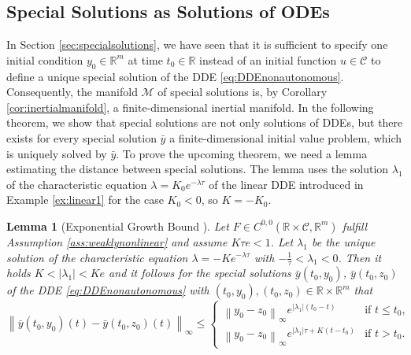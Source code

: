 \documentclass[10pt]{article}
\numberwithin{equation}{section}
\newtheorem{lemma}[theorem]{Lemma}
\newcommand\norm[1]{\left\lVert#1\right\rVert}
\begin{document}
	
	
	
	\subsection{Special Solutions as Solutions of ODEs}
	\label{sec:specialODE}
	
	In Section \ref{sec:specialsolutions}, we have seen that it is sufficient to specify one initial condition $y_0\in \mathbb{R}^m$ at time $t_0\in \mathbb{R}$ instead of an initial function $u \in \mathcal{C}$ to define a unique special solution of the DDE \eqref{eq:DDEnonautonomous}. Consequently, the manifold $\mathcal{M}$ of special solutions is, by Corollary \ref{cor:inertialmanifold}, a finite-dimensional inertial manifold. In the following theorem, we show that special solutions are not only solutions of DDEs, but there exists for every special solution $\bar{y}$ a finite-dimensional initial value problem, which is uniquely solved by $\bar{y}$. To prove the upcoming theorem, we need a lemma estimating the distance between special solutions. The lemma uses the solution $\lambda_1$ of the characteristic equation $\lambda = K_0 e^{-\lambda \tau}$ of the linear DDE introduced in Example \ref{ex:linear1} for the case $K_0<0$, so $K = -K_0 $. 
	
	\begin{lemma}[Exponential Growth Bound \cite{Driver1968}] \label{lem:specialsolutions}
		Let $F\in C^{0,0}(\mathbb{R}\times \mathcal{C}, \mathbb{R}^m)$ fulfill Assumption \ref{ass:weaklynonlinear} and assume $K \tau e < 1$. Let $\lambda_1$ be the unique solution of the characteristic equation $\lambda = -K e^{-\lambda \tau}$ with $-\frac{1}{\tau}<\lambda_1 < 0 $. Then it holds $K<\vert \lambda_1 \vert <Ke$  and it follows for the special solutions $\bar{y}(t_0,y_0)$, $\bar{y}(t_0,z_0)$ of the DDE \eqref{eq:DDEnonautonomous} with $(t_0,y_0),(t_0,z_0)\in\mathbb{R}\times \mathbb{R}^m$ that
		\begin{equation*}
			\norm{\bar{y}(t_0,y_0)(t) - \bar{y}(t_0,z_0)(t)}_\infty \leq \begin{cases}
				\norm{y_0-z_0}_\infty e^{\vert \lambda_1\vert (t_0-t)} & \text{if } t \leq t_0,\\
				\norm{y_0-z_0}_\infty e^{\vert\lambda_1\vert \tau + K(t-t_0)} & \text{if } t>t_0.
			\end{cases}
		\end{equation*} 
	\end{lemma}
	
	
\end{document}
